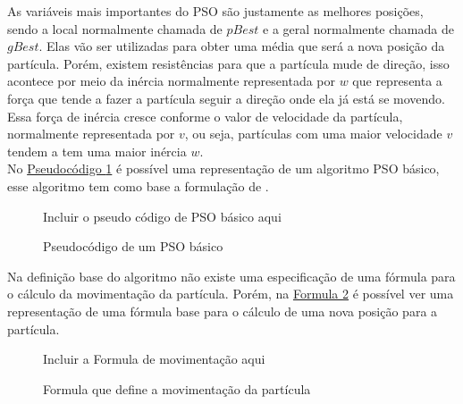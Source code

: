 \indent As variáveis mais importantes do PSO são justamente as melhores posições, sendo a local normalmente chamada de $pBest$ e a geral normalmente chamada de $gBest$. Elas vão ser utilizadas para obter uma média que será a nova posição da partícula. Porém, existem resistências para que a partícula mude de direção, isso acontece por meio da inércia normalmente representada por $w$ que representa a força que tende a fazer a partícula seguir a direção onde ela já está se movendo. Essa força de inércia cresce conforme o valor de velocidade da partícula, normalmente representada por $v$, ou seja, partículas com uma maior velocidade $v$ tendem a tem uma maior inércia $w$.\\
\indent No \hyperref[alg:pso-base]{Pseudocódigo \ref{alg:pso-base}} 
é possível uma representação de um algoritmo PSO básico, esse algoritmo tem como base a formulação de \cite{martinez2009}.

\begin{figure}[h]
    \centering
    \small{Incluir o pseudo código de PSO básico aqui}
    \caption{Pseudocódigo de um PSO básico}
    \label{alg:pso-base}
\end{figure}

Na definição base do algoritmo não existe uma especificação de uma fórmula para o cálculo da movimentação da partícula. Porém, na 
\hyperref[fig:formula-movimentacao]{Formula \ref{fig:formula-movimentacao}} 
é possível ver uma representação de uma fórmula base para o cálculo de uma nova posição para a partícula.
        
\begin{figure}[ht]
    \centering
    \small{Incluir a Formula de movimentação aqui}
    \caption{Formula que define a movimentação da partícula}
    \label{fig:formula-movimentacao}
\end{figure}



